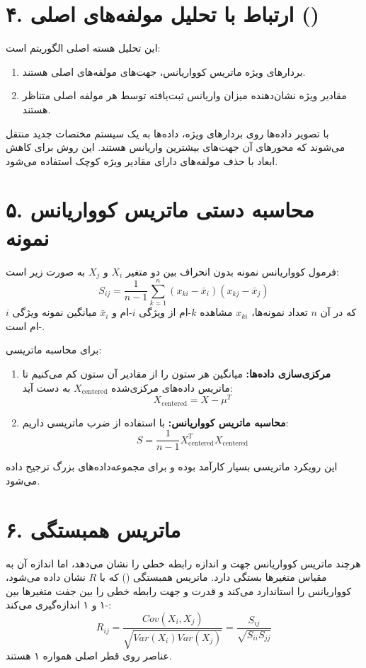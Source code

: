 \documentclass{article}
\begin{document}
\section*{۴. ارتباط با تحلیل مولفه‌های اصلی ()}
این تحلیل هسته اصلی الگوریتم  است:
\begin{enumerate}
    \item بردارهای ویژه ماتریس کوواریانس، جهت‌های مولفه‌های اصلی هستند.
    \item مقادیر ویژه نشان‌دهنده میزان واریانس ثبت‌یافته توسط هر مولفه اصلی متناظر هستند.
\end{enumerate}
با تصویر داده‌ها روی بردارهای ویژه، داده‌ها به یک سیستم مختصات جدید منتقل می‌شوند که محورهای آن جهت‌های بیشترین واریانس هستند. این روش برای کاهش ابعاد با حذف مولفه‌های دارای مقادیر ویژه کوچک استفاده می‌شود.

\section*{۵. محاسبه دستی ماتریس کوواریانس نمونه}
فرمول کوواریانس نمونه بدون انحراف بین دو متغیر $X_i$ و $X_j$ به صورت زیر است:
\[
S_{ij} = \frac{1}{n-1} \sum_{k=1}^n (x_{ki} - \bar{x}_i)(x_{kj} - \bar{x}_j)
\]
که در آن $n$ تعداد نمونه‌ها، $x_{ki}$ مشاهده $k$-ام از ویژگی $i$-ام و $\bar{x}_i$ میانگین نمونه ویژگی $i$-ام است.

برای محاسبه ماتریسی:
\begin{enumerate}
    \item \textbf{مرکزی‌سازی داده‌ها:} میانگین هر ستون را از مقادیر آن ستون کم می‌کنیم تا ماتریس داده‌های مرکزی‌شده $X_{\text{centered}}$ به دست آید:
    \[
    X_{\text{centered}} = X - \mu^T
    \]
    \item \textbf{محاسبه ماتریس کوواریانس:} با استفاده از ضرب ماتریسی داریم:
    \[
    S = \frac{1}{n-1} X_{\text{centered}}^T X_{\text{centered}}
    \]
\end{enumerate}
این رویکرد ماتریسی بسیار کارآمد بوده و برای مجموعه‌داده‌های بزرگ ترجیح داده می‌شود.

\section*{۶. ماتریس همبستگی}
هرچند ماتریس کوواریانس جهت و اندازه رابطه خطی را نشان می‌دهد، اما اندازه آن به مقیاس متغیرها بستگی دارد. ماتریس همبستگی () که با $R$ نشان داده می‌شود، کوواریانس را استاندارد می‌کند و قدرت و جهت رابطه خطی را بین جفت متغیرها بین -۱ و ۱ اندازه‌گیری می‌کند:
\[
R_{ij} = \frac{Cov(X_i, X_j)}{\sqrt{Var(X_i) Var(X_j)}} = \frac{S_{ij}}{\sqrt{S_{ii} S_{jj}}}
\]
عناصر روی قطر اصلی همواره ۱ هستند.
\end{document}
